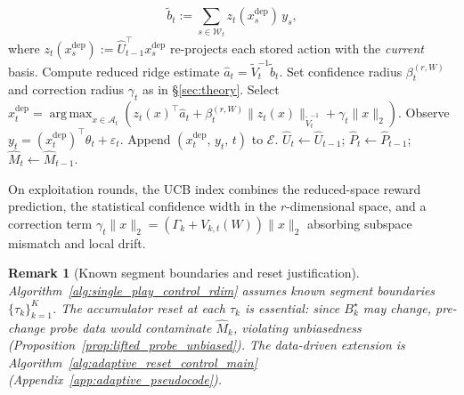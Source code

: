 \documentclass{article}
\newcommand{\cA}{\mathcal{A}}
\DeclareMathOperator*{\argmax}{arg\,max}
\newtheorem{remark}{Remark}
\begin{document}
\begin{algorithm}[t]
\begin{algorithmic}[1]
\[              \widetilde b_t
              :=
              \sum_{s\in\mathcal W_t}
                z_t(x_s^{\mathrm{dep}})\, y_s,
          \]
          where $z_t(x_s^{\mathrm{dep}}) := \widehat U_{t-1}^\top x_s^{\mathrm{dep}}$
          re-projects each stored action with the \emph{current} basis.
          \State Compute reduced ridge estimate $\widehat a_t = \widetilde V_t^{-1}\widetilde b_t$.
          \State Set confidence radius $\beta_t^{(r,W)}$ and correction radius $\gamma_t$
                 as in \S\ref{sec:theory}.
          \State Select
          $x_t^{\mathrm{dep}}
              =
              \argmax_{x \in \cA_t}
              \!\left(
              z_t(x)^\top \widehat a_t
              +
              \beta_t^{(r,W)} \|z_t(x)\|_{\widetilde V_t^{-1}}
              +
              \gamma_t \|x\|_2
              \right)$.
          \State Observe $y_t = (x_t^{\mathrm{dep}})^\top \theta_t + \varepsilon_t$.
          \State Append $(x_t^{\mathrm{dep}},\, y_t,\, t)$ to $\mathcal{E}$.
          \State $\widehat U_t \leftarrow \widehat U_{t-1}$;\;
                 $\widehat P_t \leftarrow \widehat P_{t-1}$;\;
                 $\widehat M_t \leftarrow \widehat M_{t-1}$.
      \EndIf
  \EndFor
  \end{algorithmic}
\end{algorithm}

On exploitation rounds, the UCB index combines the reduced-space reward prediction, the statistical confidence width in the $r$-dimensional space, and a correction term $\gamma_t \|x\|_2 = (\Gamma_k + V_{k,t}(W))\|x\|_2$ absorbing subspace mismatch and local drift.

\begin{remark}[Known segment boundaries and reset justification]
\label{rem:reset_justification}
Algorithm~\ref{alg:single_play_control_rdim} assumes known segment boundaries $\{\tau_k\}_{k=1}^K$. The accumulator reset at each $\tau_k$ is essential: since $B_k^\star$ may change, pre-change probe data would contaminate $\widehat M_k$, violating unbiasedness (Proposition~\ref{prop:lifted_probe_unbiased}). The data-driven extension is Algorithm~\ref{alg:adaptive_reset_control_main} (Appendix~\ref{app:adaptive_pseudocode}).
\end{remark}
\end{document}
